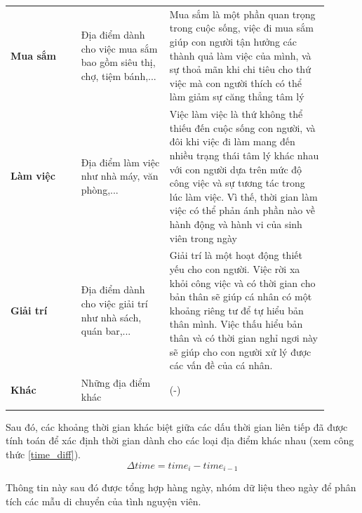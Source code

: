 \begin{longtable}{p{0.2\linewidth}  p{0.25\linewidth} p{0.45\linewidth}}
\textbf{Mua sắm} & Địa điểm dành cho việc mua sắm bao gồm siêu thị, chợ, tiệm bánh,...& Mua sắm là một phần quan trọng trong cuộc sống, việc đi mua sắm giúp con người tận hưởng các thành quả làm việc của mình, và sự thoả mãn khi chi tiêu cho thứ việc mà con người thích có thể làm giảm sự căng thẳng tâm lý  \\

\textbf{Làm việc} & Địa điểm làm việc như nhà máy, văn phòng,...& Việc làm việc là thứ không thể thiếu đến cuộc sống con người, và đôi khi việc đi làm mang đến nhiều trạng thái tâm lý khác nhau với con người dựa trên mức độ công việc và sự tương tác trong lúc làm việc. Vì thế, thời gian làm việc có thể phản ánh phần nào về hành động và hành vi của sinh viên trong ngày\\

\textbf{Giải trí} & Địa điểm dành cho việc giải trí như nhà sách, quán bar,... & Giải trí là một hoạt động thiết yếu cho con người. Việc rời xa khỏi công việc và có thời gian cho bản thân sẽ giúp cá nhân có một khoảng riêng tư để tự hiểu bản thân mình. Việc thấu hiểu bản thân và có thời gian nghỉ ngơi này sẽ giúp cho con người xử lý được các vấn đề của cá nhân. \\

\textbf{Khác} & Những địa điểm khác & (-) \\
\hline

\label{feature_type}

\end{longtable}



Sau đó, các khoảng thời gian khác biệt giữa các dấu thời gian liên tiếp đã được tính toán để xác định thời gian dành cho các loại địa điểm khác nhau (xem công thức \eqref{time_diff}).
\begin{equation}
    \Delta time= time_i-time_{i-1}
    \label{time_diff}
\end{equation}

Thông tin này sau đó được tổng hợp hàng ngày, nhóm dữ liệu theo ngày để phân tích các mẫu di chuyển của tình nguyện viên.

